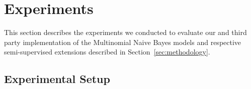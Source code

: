 \section{Experiments}
\label{sec:experiments}

This section describes the experiments we conducted to evaluate our and third 
party implementation of the Multinomial Naive Bayes models and respective 
semi-supervised extensions described in Section~\ref{sec:methodology}.

\subsection{Experimental Setup}
\label{subsec:exp-setup}


